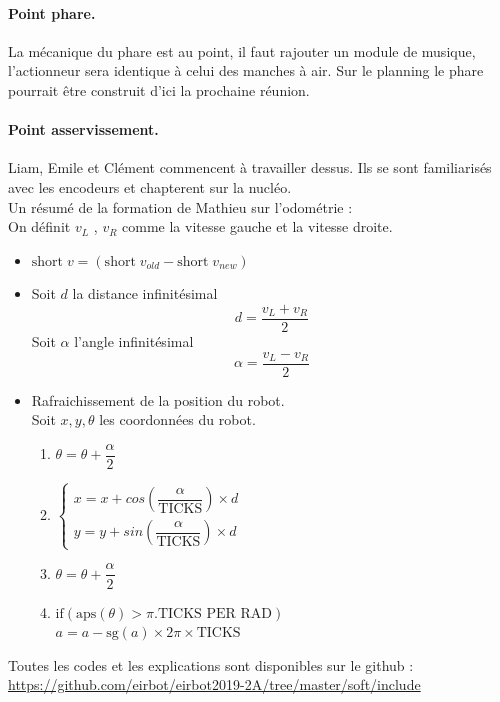 \documentclass[a4paper,10pt]{report}
\begin{document}
\begin{spacing}{1.5}
\paragraph*{Point phare.}
La mécanique du phare est au point, il faut rajouter un module de musique, l'actionneur sera identique à celui des manches à air.
Sur le planning le phare pourrait être construit d'ici la prochaine réunion.

\paragraph*{Point asservissement.}
Liam, Emile et Clément commencent à travailler dessus. Ils se sont familiarisés avec les encodeurs et chapterent sur la nucléo.\\
Un résumé de la formation de Mathieu sur l'odométrie : \\
On définit $v_L$ , $v_R$ comme la vitesse gauche et la vitesse droite.
\begin{itemize}
  \item $\text{short} \; v = (\text{short} \; v_{old} - \text{short} \; v_{new})$ %
  \item Soit $d$ la distance infinitésimal $$d = \dfrac{v_L+v_R}{2}$$ Soit $\alpha$ l'angle infinitésimal $$\alpha = \dfrac{v_L-v_R}{2}$$
  \item Rafraichissement de la position du robot. \\ Soit $x,y,\theta$ les coordonnées du robot. \begin{enumerate}
  \item $\theta = \theta + \dfrac{\alpha}{2}$
  \item $\begin{cases} x = x + cos(\dfrac{\alpha}{\text{TICKS}}) \times d \\ y = y + sin(\dfrac{\alpha}{\text{TICKS}}) \times d \end{cases}$
  \item $\theta = \theta + \dfrac{\alpha}{2}$
  \item $\text{if}(\text{aps}(\theta) > \pi.\text{TICKS PER RAD})$ \\ $a=a-\text{sg}(a)\times 2 \pi \times \text{TICKS}$
  \end{enumerate}
\end{itemize}
Toutes les codes et les explications sont disponibles sur le github : \url{https://github.com/eirbot/eirbot2019-2A/tree/master/soft/include}


\end{spacing}
\end{document}
